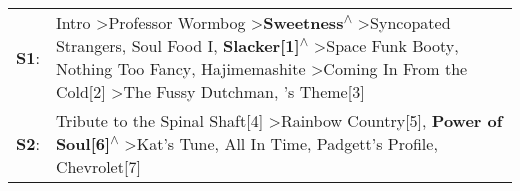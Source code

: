 \begin{supertabular}{p{0.03\textwidth}p{0.92\textwidth}}
 \textbf{S1}:  &  Intro\textsuperscript{} \textgreater \enspace Professor Wormbog\textsuperscript{} \textgreater \enspace \textbf{Sweetness\textsuperscript{$\wedge$}} \textgreater \enspace Syncopated Strangers\textsuperscript{}, \enspace Soul Food I\textsuperscript{}, \enspace \textbf{Slacker[1]\textsuperscript{$\wedge$}} \textgreater \enspace Space Funk Booty\textsuperscript{}, \enspace Nothing Too Fancy\textsuperscript{}, \enspace Hajimemashite\textsuperscript{} \textgreater \enspace Coming In From the Cold[2]\textsuperscript{} \textgreater \enspace The Fussy Dutchman\textsuperscript{}, 's Theme[3]\textsuperscript{}  \enspace  \\
 \textbf{S2}:  &                                                                                                                                                                                                                                                                                 Tribute to the Spinal Shaft[4]\textsuperscript{} \textgreater \enspace Rainbow Country[5]\textsuperscript{}, \enspace \textbf{Power of Soul[6]\textsuperscript{$\wedge$}} \textgreater \enspace Kat's Tune\textsuperscript{}, \enspace All In Time\textsuperscript{}, \enspace Padgett's Profile\textsuperscript{}, \enspace Chevrolet[7]\textsuperscript{}  \enspace  \\
\end{supertabular}
